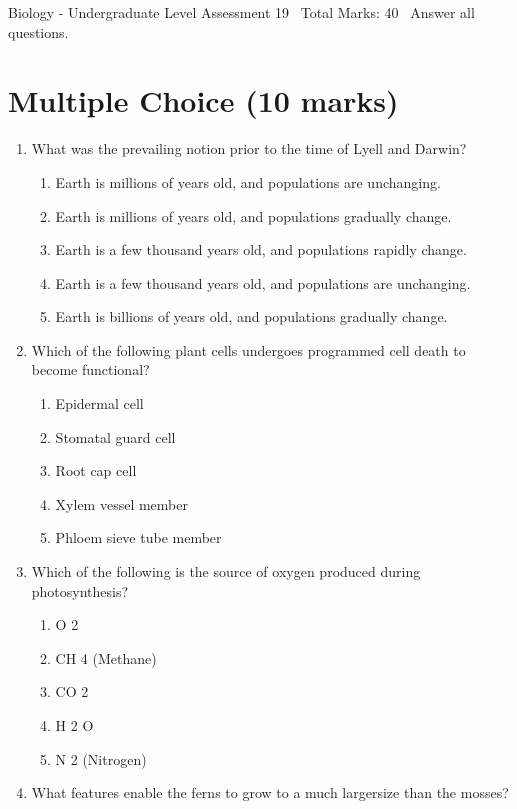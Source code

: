 \documentclass[12pt]{article}
\begin{document}
\begin{center}
Biology - Undergraduate Level Assessment 19 \
Total Marks: 40 \
Answer all questions.
\end{center}

\section*{Multiple Choice (10 marks)}
\begin{enumerate}[label=\arabic*.]
\item What was the prevailing notion prior to the time of Lyell and Darwin?
\begin{enumerate}[label=(\alph*)]
    \item Earth is millions of years old, and populations are unchanging.
    \item Earth is millions of years old, and populations gradually change.
    \item Earth is a few thousand years old, and populations rapidly change.
    \item Earth is a few thousand years old, and populations are unchanging.
    \item Earth is billions of years old, and populations gradually change.
\end{enumerate}
\item Which of the following plant cells undergoes programmed cell death to become functional?
\begin{enumerate}[label=(\alph*)]
    \item Epidermal cell
    \item Stomatal guard cell
    \item Root cap cell
    \item Xylem vessel member
    \item Phloem sieve tube member
\end{enumerate}
\item Which of the following is the source of oxygen produced during photosynthesis?
\begin{enumerate}[label=(\alph*)]
    \item O 2
    \item CH 4 (Methane)
    \item CO 2
    \item H 2 O
    \item N 2 (Nitrogen)
\end{enumerate}
\item What features enable the ferns to grow to a much largersize than the mosses?

\end{enumerate}
\end{document}

